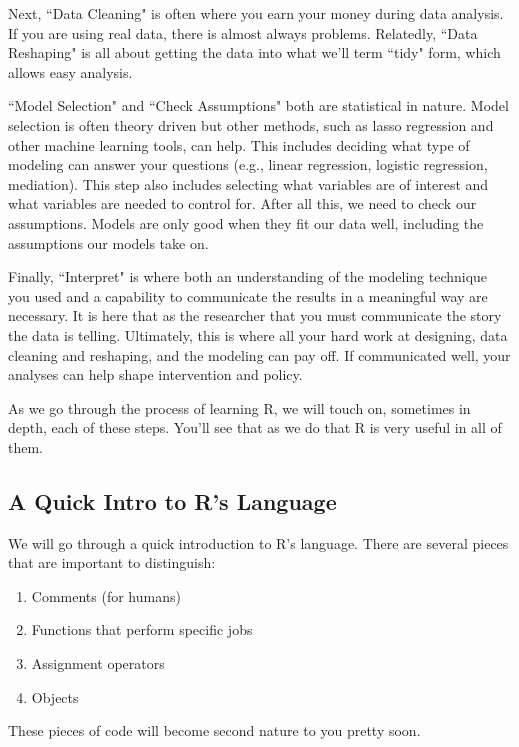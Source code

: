 \documentclass{book}
\begin{document}
Next, ``Data Cleaning" is often where you earn your money during data analysis. If you are using real data, there is almost always problems. Relatedly, ``Data Reshaping" is all about getting the data into what we'll term ``tidy" form, which allows easy analysis.

``Model Selection" and ``Check Assumptions" both are statistical in nature. Model selection is often theory driven but other methods, such as lasso regression and other machine learning tools, can help. This includes deciding what type of modeling can answer your questions (e.g., linear regression, logistic regression, mediation). This step also includes selecting what variables are of interest and what variables are needed to control for. After all this, we need to check our assumptions. Models are only good when they fit our data well, including the assumptions our models take on. 

Finally, ``Interpret" is where both an understanding of the modeling technique you used and a capability to communicate the results in a meaningful way are necessary. It is here that as the researcher that you must communicate the story the data is telling. Ultimately, this is where all your hard work at designing, data cleaning and reshaping, and the modeling can pay off. If communicated well, your analyses can help shape intervention and policy.

As we go through the process of learning R, we will touch on, sometimes in depth, each of these steps. You'll see that as we do that R is very useful in all of them.

\subsection*{A Quick Intro to R's Language}

We will go through a quick introduction to R's language. There are several pieces that are important to distinguish:
\begin{enumerate}
\item Comments (for humans)
\item Functions that perform specific jobs
\item Assignment operators
\item Objects
\end{enumerate}
These pieces of code will become second nature to you pretty soon.
\end{document}
